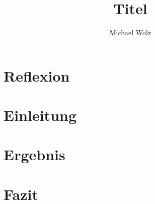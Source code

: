 \documentclass[11pt,a4paper,pageskip=full]{scrartcl}
\author{Michael Wolz}
\title{Titel}
\begin{document}
\maketitle


\section{Reflexion}

\section{Einleitung}

\section{Ergebnis}

\section{Fazit}
\end{document}
